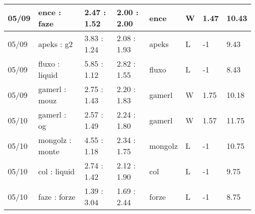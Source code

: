 \begin{small}
\begin{longtable}{|l|l|l|l|l|l|l|l|}
	05/09                               & ence : faze                         & 2.47 : 1.52                             & 2.00 : 2.00                             & ence                              & W                                 & 1.47                                 & 10.43                             \\ \hline
	05/09                               & apeks : g2                          & 3.83 : 1.24                             & 2.08 : 1.93                             & apeks                             & L                                 & -1                                   & 9.43                              \\ \hline
	05/09                               & fluxo : liquid                      & 5.85 : 1.12                             & 2.82 : 1.55                             & fluxo                             & L                                 & -1                                   & 8.43                              \\ \hline
	05/09                               & gamerl : mouz                       & 2.75 : 1.43                             & 2.20 : 1.83                             & gamerl                            & W                                 & 1.75                                 & 10.18                             \\ \hline
	05/10                               & gamerl : og                         & 2.57 : 1.49                             & 2.24 : 1.80                             & gamerl                            & W                                 & 1.57                                 & 11.75                             \\ \hline
	05/10                               & mongolz : monte                     & 4.55 : 1.18                             & 2.34 : 1.75                             & mongolz                           & L                                 & -1                                   & 10.75                             \\ \hline
	05/10                               & col : liquid                        & 2.74 : 1.42                             & 2.12 : 1.90                             & col                               & L                                 & -1                                   & 9.75                              \\ \hline
	05/10                               & faze : forze                        & 1.39 : 3.04                             & 1.69 : 2.44                             & forze                             & L                                 & -1                                   & 8.75                              \\ \hline

\end{longtable}
\end{small}
